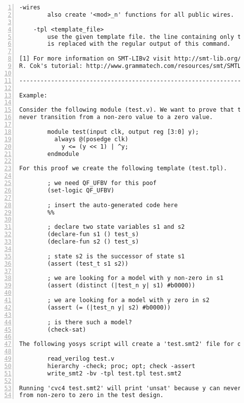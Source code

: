 \begin{lstlisting}[numbers=left,frame=single]
    -wires
        also create '<mod>_n' functions for all public wires.

    -tpl <template_file>
        use the given template file. the line containing only the token '%%'
        is replaced with the regular output of this command.

[1] For more information on SMT-LIBv2 visit http://smt-lib.org/ or read David
R. Cok's tutorial: http://www.grammatech.com/resources/smt/SMTLIBTutorial.pdf

---------------------------------------------------------------------------

Example:

Consider the following module (test.v). We want to prove that the output can
never transition from a non-zero value to a zero value.

        module test(input clk, output reg [3:0] y);
          always @(posedge clk)
            y <= (y << 1) | ^y;
        endmodule

For this proof we create the following template (test.tpl).

        ; we need QF_UFBV for this poof
        (set-logic QF_UFBV)

        ; insert the auto-generated code here
        %%

        ; declare two state variables s1 and s2
        (declare-fun s1 () test_s)
        (declare-fun s2 () test_s)

        ; state s2 is the successor of state s1
        (assert (test_t s1 s2))

        ; we are looking for a model with y non-zero in s1
        (assert (distinct (|test_n y| s1) #b0000))

        ; we are looking for a model with y zero in s2
        (assert (= (|test_n y| s2) #b0000))

        ; is there such a model?
        (check-sat)

The following yosys script will create a 'test.smt2' file for our proof:

        read_verilog test.v
        hierarchy -check; proc; opt; check -assert
        write_smt2 -bv -tpl test.tpl test.smt2

Running 'cvc4 test.smt2' will print 'unsat' because y can never transition
from non-zero to zero in the test design.
\end{lstlisting}


